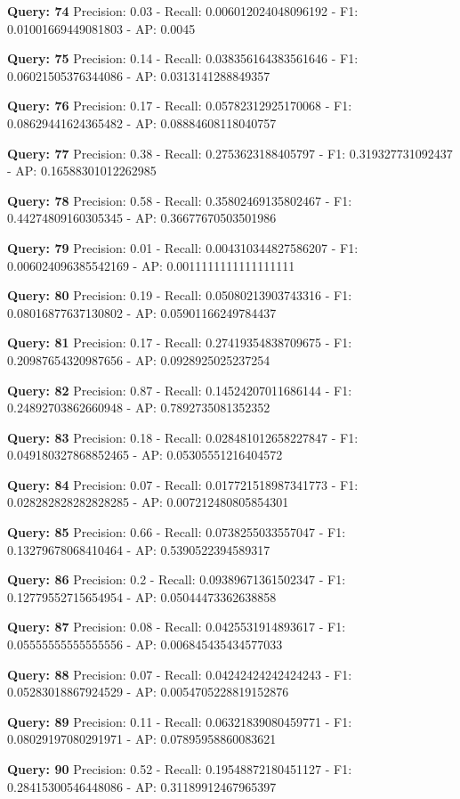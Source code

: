 \documentclass[a4paper, 11pt]{article}
\begin{document}
\textbf{Query: 74}
Precision: 0.03 - Recall: 0.006012024048096192 - F1: 0.01001669449081803 - AP: 0.0045

\textbf{Query: 75}
Precision: 0.14 - Recall: 0.038356164383561646 - F1: 0.06021505376344086 - AP:  0.0313141288849357

\textbf{Query: 76}
Precision: 0.17 - Recall: 0.05782312925170068 - F1: 0.08629441624365482 - AP:  0.08884608118040757

\textbf{Query: 77}
Precision: 0.38 - Recall: 0.2753623188405797 - F1: 0.319327731092437 - AP:  0.16588301012262985

\textbf{Query: 78}
Precision: 0.58 - Recall: 0.35802469135802467 - F1: 0.44274809160305345 - AP:  0.36677670503501986

\textbf{Query: 79}
Precision: 0.01 - Recall: 0.004310344827586207 - F1: 0.006024096385542169 - AP:  0.0011111111111111111

\textbf{Query: 80}
Precision: 0.19 - Recall: 0.05080213903743316 - F1: 0.08016877637130802 - AP:  0.05901166249784437

\textbf{Query: 81}
Precision: 0.17 - Recall: 0.27419354838709675 - F1: 0.20987654320987656 - AP:  0.0928925025237254

\textbf{Query: 82}
Precision: 0.87 - Recall: 0.14524207011686144 - F1: 0.24892703862660948 - AP:  0.7892735081352352

\textbf{Query: 83}
Precision: 0.18 - Recall: 0.028481012658227847 - F1: 0.049180327868852465 - AP:  0.05305551216404572

\textbf{Query: 84}
Precision: 0.07 - Recall: 0.017721518987341773 - F1: 0.028282828282828285 - AP:  0.007212480805854301

\textbf{Query: 85}
Precision: 0.66 - Recall: 0.0738255033557047 - F1: 0.13279678068410464 - AP:  0.5390522394589317

\textbf{Query: 86}
Precision: 0.2 - Recall: 0.09389671361502347 - F1: 0.12779552715654954 - AP:  0.05044473362638858

\textbf{Query: 87}
Precision: 0.08 - Recall: 0.0425531914893617 - F1: 0.05555555555555556 - AP:  0.006845435434577033

\textbf{Query: 88}
Precision: 0.07 - Recall: 0.04242424242424243 - F1: 0.05283018867924529 - AP:  0.0054705228819152876

\textbf{Query: 89}
Precision: 0.11 - Recall: 0.06321839080459771 - F1: 0.08029197080291971 - AP:  0.07895958860083621

\textbf{Query: 90}
Precision: 0.52 - Recall: 0.19548872180451127 - F1: 0.28415300546448086 - AP:  0.31189912467965397\\
\end{document}
